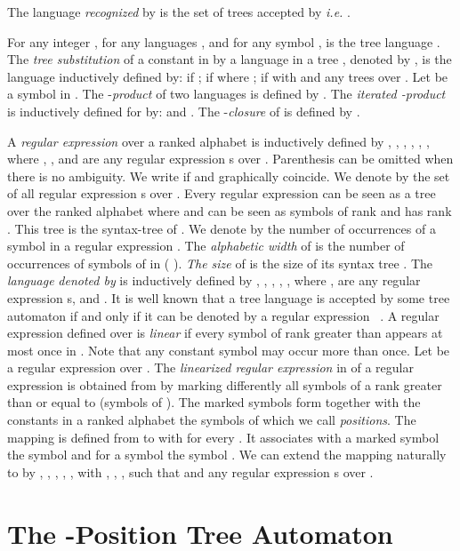 \documentclass{llncs}
\begin{document}
  The language  \emph{recognized} by  is the set of trees accepted by   \emph{i.e.} . 

For any integer , for any  languages , and for any symbol  ,  is the tree language . The \emph{tree substitution} of a constant  in  by a language  in a tree , denoted by , is the language inductively defined by:
    if ;  if  where ;  if  with  and  any  trees over .   
    Let  be a symbol in . The -\emph{product}  of two languages  is  defined by . The \emph{iterated -product} is  inductively  defined for  by:   and . The -\emph{closure} of  is defined by  .
    
A \emph{regular expression } over a ranked alphabet  is inductively defined by  , , , , , , where , ,  and  are any  regular expression s over . Parenthesis can be omitted when there is no ambiguity. We write  if  and  graphically coincide. We denote by  the set of all regular expression s over . Every regular expression   can be seen as a tree over the ranked alphabet  where  and  can be seen as symbols
 of rank  and  has rank . This tree is the syntax-tree  of . We denote by  the number of occurrences of a symbol  in a regular expression . The \emph{alphabetic width}  of  is the number of occurrences of symbols of  in  ( ). \emph{The size}  of  is the size of its syntax tree . The \emph{language}   \emph{denoted by}  is inductively defined by
 , , , , ,  where  ,  are any  regular expression s,   and . It is well known that a tree language  is accepted by some tree automaton if and only if it can be denoted by a regular expression  ~\cite{automate1,automate2}.
A regular expression   defined over  is  \emph{linear} 
if every symbol of rank greater than  appears at most once in . Note that any constant symbol may occur more than once. Let  be a regular expression  over . The  \emph{linearized regular expression }  in  of a regular expression   is obtained from  by marking differently all symbols of a rank  greater than or equal to  (symbols of ). The marked symbols form together with the constants in  a ranked alphabet  the symbols of which we call \emph{positions}.
The mapping  is defined from  to  with  for every  . It associates with a marked symbol  the symbol  and for a symbol  the symbol .
We can extend the mapping  naturally to   by , , , , , with , , ,  such that  and  any regular expression s over . 


\section{The -Position Tree Automaton}\label{sec automata}
\end{document}
